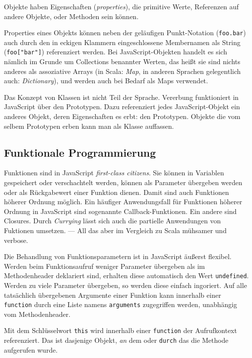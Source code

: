 \documentclass[a4paper, 12pt, listof=totoc, bibliography=totoc]{scrreprt}
\begin{document}
Objekte haben Eigenschaften (\textit{properties}), die primitive Werte, Referenzen auf andere Objekte, oder Methoden sein können.

Properties eines Objekts können neben der geläufigen Punkt-Notation (\texttt{foo.bar}) auch durch den in eckigen Klammern eingeschlossene Membernamen als String (\texttt{foo["bar"]}) referenziert werden. Bei JavaScript-Objekten handelt es sich nämlich im Grunde um Collections benannter Werten, das heißt sie sind nichts anderes als assoziative Arrays (in Scala: \textit{Map}, in anderen Sprachen gelegentlich auch: \textit{Dictionary}), und werden auch bei Bedarf als Maps verwendet.

Das Konzept von Klassen ist nicht Teil der Sprache. Vererbung funktioniert in JavaScript über den Prototypen. Dazu referenziert jedes JavaScript-Objekt ein anderes Objekt, deren Eigenschaften es erbt: den Prototypen. Objekte die vom selbem Prototypen erben kann man als Klasse auffassen.\cite{mdn.WWO}\cite[S. 115 ff., S. 199 ff.]{flanagan2011.JDG}

\subsection{Funktionale Programmierung}

Funktionen sind in JavaScript \textit{first-class citizens}. Sie können in Variablen gespeichert oder verschachtelt werden, können als Parameter übergeben werden oder als Rückgabewert einer Funktion dienen. Damit sind auch Funktionen höherer Ordnung möglich. Ein häufiger Anwendungsfall für Funktionen höherer Ordnung in JavaScript sind sogenannte Callback-Funktionen. Ein andere sind Closures. Durch \textit{Currying} lässt sich auch die partielle Anwendungen von Fuktionen umsetzen. --- All das aber im Vergleich zu Scala mühsamer und verbose.

Die Behandlung von Funktionsparametern ist in JavaScript äußerst flexibel. Werden beim Funktionsaufruf weniger Parameter übergeben als im Methodenheader deklariert sind, erhalten diese automatisch den Wert \texttt{undefined}. Werden zu viele Parameter übergeben, so werden diese einfach ingoriert. Auf alle tatsächlich übergebenen Argumente einer Funktion kann innerhalb einer \texttt{function} durch eine Liste namens \texttt{arguments} zugegriffen werden, unabhängig vom Methodenheader.

Mit dem Schlüsselwort \texttt{this} wird innerhalb einer \texttt{function} der Aufrufkontext referenziert. Das ist dasjenige Objekt, \textit{an} dem oder \texttt{durch} das die Methode aufgerufen wurde. 
\cite[199 ff.]{flanagan2011.JDG}
\end{document}
